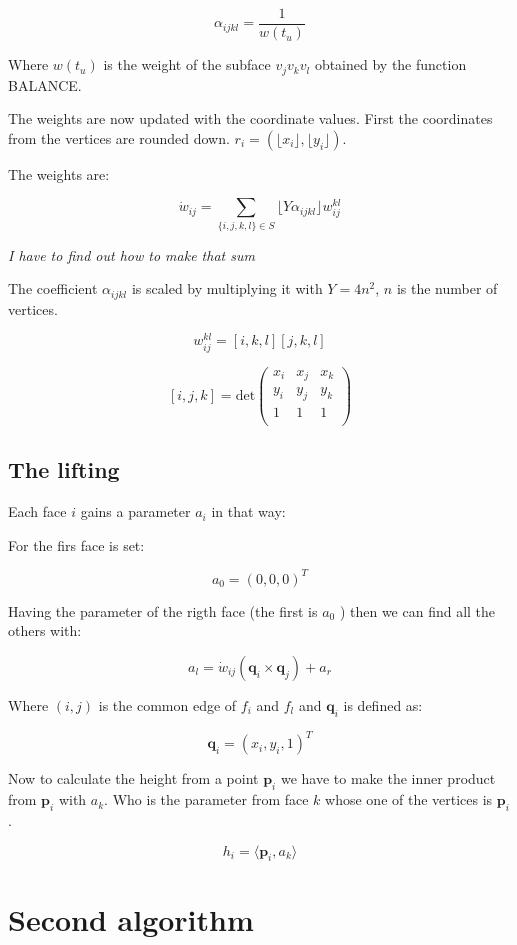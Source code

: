 \documentclass[10pt,a4paper]{article}
\begin{document}
$$\alpha_{ijkl} = \frac{1}{w(t_u)}$$

Where $w(t_u)$ is the weight of the subface $v_jv_kv_l$ obtained by the function BALANCE.

The weights are now updated with the coordinate values. First the coordinates from the vertices are rounded down. $r_i = (\lfloor x_i \rfloor, \lfloor y_i\rfloor)$.

The weights are:

$$\dot{w}_{ij}= \sum_{\{i,j,k,l\}\in S} \lfloor Y \alpha_{ijkl}\rfloor w^{kl}_{ij}$$   

\textit{I have to find out how to make that sum}

The coefficient $\alpha_{ijkl}$ is scaled by multiplying it with $Y = 4 n^2$, $n$ is the number of vertices.


$$w^{kl}_{ij}= [i,k,l][j,k,l]$$

$$
[i,j,k]= \text{det}
 \begin{pmatrix}
  x_i & x_j & x_k\\
  y_i & y_j & y_k\\
  1	  & 1   & 1  \\
 \end{pmatrix}
$$

\subsection{The lifting}

Each face $i$ gains a parameter $a_i$ in that way:

For the firs face is set:

$$a_0 = (0,0,0)^T$$   

Having the parameter of the rigth face (the first is $a_0$ ) then we can find all the others with:

$$a_l= \dot{w}_{ij}(\mathbf{q}_i\times\mathbf{q}_j)+a_r$$

Where $(i,j)$ is the common edge of $f_i$ and $f_l$ and $\mathbf{q}_i$ is defined as:

$$\mathbf{q}_i = (x_i,y_i,1)^T$$

Now to calculate the height from a point $\mathbf{p}_i$ we have to make the inner product from $\mathbf{p}_i$ with $a_k$. Who is the parameter from face $k$ whose one of the vertices is $\mathbf{p}_i$.

$$h_i = \langle \mathbf{p}_i, a_k\rangle$$

\section{Second algorithm}
\end{document}
